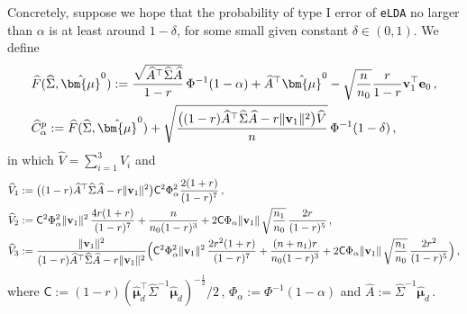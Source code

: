\documentclass[12pt]{article}
\numberwithin{equation}{section}
\theoremstyle{remark}
\newcommand{\1}{{\rm 1}\kern-0.24em{\rm I}}
\begin{document}
Concretely, suppose we hope that the probability of type I error of \verb+eLDA+ no larger than $\alpha$ is at least around $1-\delta$, for some small given constant $\delta\in(0,1)$. We define
 \begin{align}
&\widehat{F}(\widehat\Sigma, \hat{\bm{\mu}}^0):= \frac{\sqrt{  \widehat A^{\top} \widehat\Sigma \widehat A}}{1-r} \, \Phi^{-1}(1-\alpha) +  \widehat{A} ^{\top} \hat{\bm{\mu}}^0- \sqrt{\frac{n}{n_0}} \frac{r}{1-r} {\bf v}_1^{\top} {\bf e}_0\,,\label{def:whF}\\
&
\widehat C_\alpha^p:=\widehat{F}(\widehat\Sigma, \hat{\bm{\mu}}^0) +\sqrt{ \frac{\big((1-r) \widehat A^{\top} \widehat\Sigma \widehat A - r\Vert {\bf v}_1\Vert^2\big)  \widehat {V}}{ n}} \, \Phi^{-1}(1-\delta)\,, \label{def:whC}
\end{align}
in which $\widehat {V}=\sum_{i=1}^3 \widehat {V}_i$ and 
\begin{align} \label{def:V123}
&\widehat{V}_1:= \big((1-r) \widehat A^{\top} \widehat\Sigma \widehat A - r\Vert {\bf v}_1\Vert^2\big)\mathsf{C}^2 \Phi_\alpha^2  \frac{2(1+r)}{(1-r)^7}\,, \notag\\
&\widehat{V}_2:=\mathsf{C}^2 \Phi_\alpha^2 \Vert{\bf v}_1\Vert^2 \, \frac{4r(1+r)}{(1-r)^7}  + \frac{n}{n_0(1-r)^3}
+2 \mathsf{C} \Phi_\alpha \Vert{\bf v}_1\Vert \, \sqrt{\frac{n_1}{n_0}}\, \frac{2r}{(1-r)^5}\,,  \notag\\
&\widehat{V}_3:=\frac{\Vert {\bf v}_1\Vert^2}{ (1-r)\widehat A^{\top} \widehat\Sigma \widehat A  - r\Vert {\bf v}_1\Vert^2}  \Big(\mathsf{C}^2 \Phi_\alpha^2 \Vert{\bf v}_1\Vert^2 \, \frac{2r^2(1+r)}{(1-r)^7}  + \frac{(n+n_1)r}{n_0(1-r)^3}
+2 \mathsf{C} \Phi_\alpha \Vert{\bf v}_1\Vert \, \sqrt{\frac{n_1}{n_0}}\, \frac{2r^2}{(1-r)^5}  \Big)\,,
\end{align}
where $\mathsf{C}:=(1-r)(\hat {\bm{\mu}}_d^{\top} \widehat\Sigma^{-1} \hat {\bm{\mu}}_d )^{-\frac 12}/2 \,$, $\Phi_\alpha:=\Phi^{-1}(1-\alpha)$ and $ \widehat A := \widehat \Sigma^{-1} \hat{\bm{\mu}}_d\,$.

\end{document}
